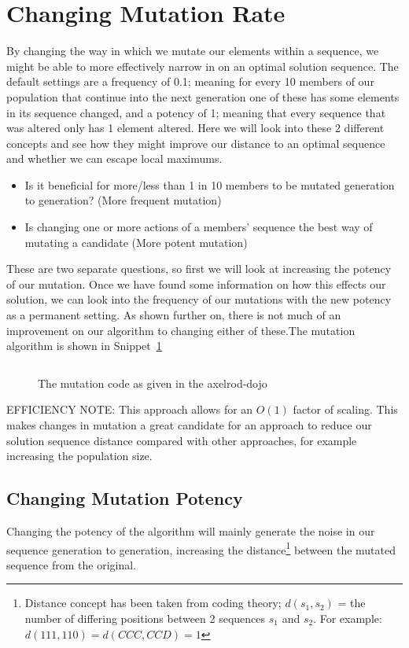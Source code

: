 \section{Changing Mutation Rate}\label{sec:changeingmutationrate}
By changing the way in which we mutate our elements within a sequence, we might be able to more effectively narrow in on an optimal solution sequence.
The default settings are a frequency of 0.1; meaning for every 10 members of our population that continue into the next generation one of these has some elements in its sequence changed, and a potency of 1;
meaning that every sequence that was altered only has 1 element altered.
Here we will look into these 2 different concepts and see how they might improve our distance to an optimal sequence and whether we can escape local maximums.
\begin{itemize}
    \item Is it beneficial for more/less than 1 in 10 members to be mutated generation to generation? (More frequent mutation)
    \item Is changing one or more actions of a members' sequence the best way of mutating a candidate (More potent mutation)
\end{itemize}

These are two separate questions, so first we will look at increasing the potency of our mutation.
Once we have found some information on how this effects our solution, we can look into the frequency of our mutations with the new potency as a permanent setting.
As shown further on, there is not much of an improvement on our algorithm to changing either of these.The mutation algorithm is shown in Snippet~\ref{code:mutateFromDojo}

\begin{figure}
    \inputminted{python}{code_snippets/mutateFromDojo.py}
    \caption{The mutation code as given in the axelrod-dojo}\label{code:mutateFromDojo}
\end{figure}

EFFICIENCY NOTE\@: This approach allows for an \(O(1)\) factor of scaling.
This makes changes in mutation a great candidate for an approach to reduce our solution sequence distance compared with other approaches, for example increasing the population size.

\subsection{Changing Mutation Potency}\label{subsec:changingMutationPotency}
Changing the potency of the algorithm will mainly generate the noise in our sequence generation to generation, increasing the distance\footnote{Distance concept has been taken from coding theory; \(d(s_1,s_2)\) = the number of differing positions between 2 sequences \(s_1\) and \(s_2\).
For example: \(d(111,110) = d(CCC,CCD) = 1 \)} between the mutated sequence from the original.

